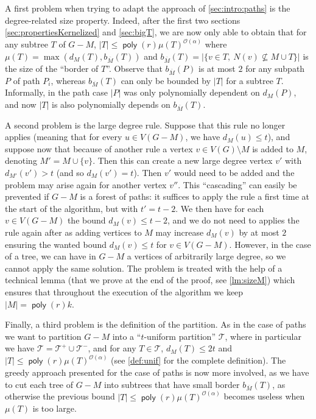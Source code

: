 \documentclass{amsart}
\newcommand{\bom}{b_{\overline{M}}}
\newcommand{\mT}{\mathcal{T}}
\DeclareMathOperator\poly{\textsf{poly}}
\renewcommand{\O}{\mathcal{O}}
\begin{document}
 
 A first problem when trying to adapt the approach of \autoref{sec:intro:paths} is the degree-related size property. Indeed, after the first two sections \autoref{sec:propertiesKernelized} and \autoref{sec:bigT}, we are now only able to obtain that for any subtree $T$ of $G-M$,  $|T| \le \poly(r)\mu(T)^{\O(\alpha)}$ where $\mu(T)=\max(d_M(T),\bom(T))$ and $\bom(T)=|\{v\in T,~N(v) \not\subseteq M\cup T \}|$ is the size of the ``border of $T$''.  Observe that $\bom(P)$ is at most $2$ for any subpath $P$ of path $P_i$, whereas $\bom(T)$ can only be bounded by $|T|$ for a subtree $T$.
 Informally, in the path case $|P|$ was only polynomially dependent on $d_M(P)$, and now
 $|T|$ is also polynomially depends on $\bom(T)$.
 
 A second problem is the large degree rule. 
 Suppose that this rule no longer applies (meaning that for every $u\in V(G-M)$, we have $d_M(u)\leq t$), and suppose now that because of another rule a vertex $v \in V(G)\setminus M$ is added to $M$, denoting $M'=M \cup \{v\}$. Then this can create a new large degree vertex 
 $v'$ with $d_{M'}(v')>t$ (and so $d_{M}(v') = t$). Then $v'$ would need to be added and the problem may arise again for another vertex $v''$. This ``cascading'' can easily be prevented if $G-M$ is a forest of paths: it suffices to apply the rule a first time at the start of the algorithm, but with $t'=t-2$. We then have for each $v\in V(G-M)$ the bound $d_M(v)\leq t-2$, and we do not need to applies the rule again after as adding vertices to $M$ may increase $d_M(v)$ by at most $2$ ensuring the wanted bound $d_M(v)\leq t$ for $v\in V(G-M)$.
 However, in the case of a tree, we can have in $G-M$ a vertices of arbitrarily large degree, so we cannot apply the same solution.
 The problem is treated with the help of a technical lemma (that we prove at the end of the proof, see \autoref{lm:sizeM}) which ensures that throughout the execution of the algorithm we keep $|M|=\poly(r)k$.
 
 Finally, a third problem is the definition of the partition. As in the case of paths we want to partition $G-M$ into a ``$t$-uniform partition'' $\mT$, where in particular we have $\mT=\mT^+ \cup \mT^-$, and for any $T \in \mT$, $d_M(T)\le 2t$ and $|T|\leq \poly(r)\mu(T)^{\O(\alpha)}$ (see \autoref{def:unif} for the complete definition).
 The greedy approach presented for the case of paths is now more involved, as we have to cut each tree of $G-M$ into subtrees that have small border $\bom(T)$, as otherwise the previous bound $|T| \le \poly(r)\mu(T)^{\O(\alpha)}$ becomes useless when $\mu(T)$ is too large.
 
\end{document}
